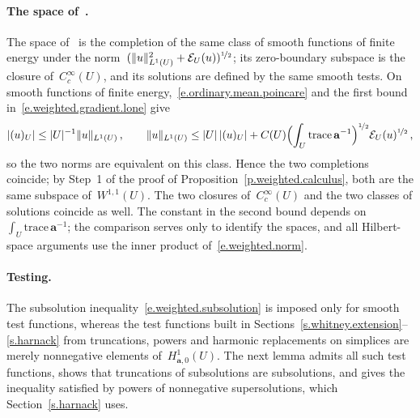 \documentclass[11pt,letterpaper]{article}
\numberwithin{equation}{section}
\theoremstyle{definition}
\renewcommand{\a}{\mathbf{a}}
\newcommand{\nf}{\nicefrac}
\newcommand*{\tr}{\mathrm{trace\,}}
\DeclarePairedDelimiter{\norm}{\lVert}{\rVert}
\newcommand{\Ener}{\mathcal E}
\newcommand{\Hzero}[1]{H^1_{#1,0}}
\begin{document}
\paragraph{The space of~\cite{AK.HC}.} The space of~\cite[Section~2.1]{AK.HC} is the completion of the same class of smooth functions of finite energy under the norm~$(\norm{u}_{L^1(U)}^2+\Ener_U(u))^{\nf12}$; its zero-boundary subspace is the closure of~$C^\infty_c(U)$, and its solutions are defined by the same smooth tests. On smooth functions of finite energy,~\eqref{e.ordinary.mean.poincare} and the first bound in~\eqref{e.weighted.gradient.lone} give
\begin{equation*}
	|(u)_U|\leq|U|^{-1}\norm{u}_{L^1(U)}\,,\qquad \norm{u}_{L^1(U)}\leq|U|\,|(u)_U|+C(U)\Bigl(\int_U\tr\a^{-1}\Bigr)^{\nf12}\Ener_U(u)^{\nf12}\,,
\end{equation*}
so the two norms are equivalent on this class. Hence the two completions coincide; by Step~1 of the proof of Proposition~\ref{p.weighted.calculus}, both are the same subspace of~$W^{1,1}(U)$. The two closures of~$C^\infty_c(U)$ and the two classes of solutions coincide as well. The constant in the second bound depends on~$\int_U\tr\a^{-1}$; the comparison serves only to identify the spaces, and all Hilbert-space arguments use the inner product of~\eqref{e.weighted.norm}.

\paragraph{Testing.} The subsolution inequality~\eqref{e.weighted.subsolution} is imposed only for smooth test functions, whereas the test functions built in Sections~\ref{s.whitney.extension}--\ref{s.harnack} from truncations, powers and harmonic replacements on simplices are merely nonnegative elements of~$\Hzero{\a}(U)$. The next lemma admits all such test functions, shows that truncations of subsolutions are subsolutions, and gives the inequality satisfied by powers of nonnegative supersolutions, which Section~\ref{s.harnack} uses.
\end{document}
